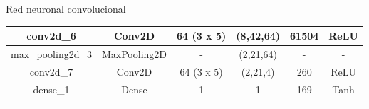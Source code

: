 \documentclass[10pt]{beamer}
\begin{document}
\begin{frame}{Red neuronal convolucional}
\begin{table}[!h]
{\begin{tabular}{@{}cccccc@{}}
        \multicolumn{1}{|c|}{conv2d\_6}         & \multicolumn{1}{c|}{Conv2D}        & \multicolumn{1}{c|}{64 (3 x 5)}                                                            & \multicolumn{1}{c|}{(8,42,64)}                                                                 & \multicolumn{1}{c|}{61504}                                                                      & \multicolumn{1}{c|}{ReLU}                                                                      \\ \midrule
        \multicolumn{1}{|c|}{max\_pooling2d\_3} & \multicolumn{1}{c|}{MaxPooling2D}  & \multicolumn{1}{c|}{-}                                                                     & \multicolumn{1}{c|}{(2,21,64)}                                                                 & \multicolumn{1}{c|}{-}                                                                          & \multicolumn{1}{c|}{-}                                                                         \\ \midrule
        \multicolumn{1}{|c|}{conv2d\_7}         & \multicolumn{1}{c|}{Conv2D}        & \multicolumn{1}{c|}{64 (3 x 5)}                                                            & \multicolumn{1}{c|}{(2,21,4)}                                                                  & \multicolumn{1}{c|}{260}                                                                        & \multicolumn{1}{c|}{ReLU}                                                                      \\ \midrule
        \multicolumn{1}{|c|}{dense\_1}          & \multicolumn{1}{c|}{Dense}         & \multicolumn{1}{c|}{1}                                                                     & \multicolumn{1}{c|}{1}                                                                         & \multicolumn{1}{c|}{169}                                                                        & \multicolumn{1}{c|}{Tanh}                                                                      \\ \midrule
                                                &                                    &                                                                                            &                                                                                                &                                                                                                 &                                                                                                \\ \cmidrule(l){3-6} 

\end{tabular}}
\end{table}
\end{frame}
\end{document}
